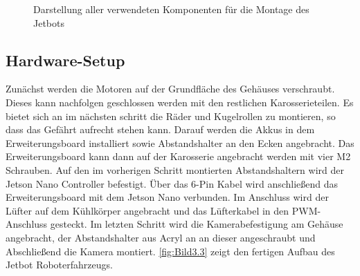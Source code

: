 \begin{figure}[H]
    \centering
    \caption[Komponenten Jetbot]{Darstellung aller verwendeten Komponenten für die Montage des Jetbots}
    \label{fig:Bild3.2}
\end{figure}

\subsection{Hardware-Setup}

Zunächst werden die Motoren auf der Grundfläche des Gehäuses verschraubt. Dieses kann nachfolgen geschlossen werden mit den restlichen Karosserieteilen. Es bietet sich an im nächsten schritt die Räder und Kugelrollen zu montieren, so dass das Gefährt aufrecht stehen kann. Darauf werden die Akkus in dem Erweiterungsboard installiert sowie Abstandshalter an den Ecken angebracht. Das Erweiterungsboard kann dann auf der Karosserie angebracht werden mit vier M2 Schrauben. Auf den im vorherigen Schritt montierten Abstandshaltern wird der Jetson Nano Controller befestigt. Über das 6-Pin Kabel wird anschließend das Erweiterungsboard mit dem Jetson Nano verbunden. Im Anschluss wird der Lüfter auf dem Kühlkörper angebracht und das Lüfterkabel in den PWM-Anschluss gesteckt. Im letzten Schritt wird die Kamerabefestigung am Gehäuse angebracht, der Abstandshalter aus Acryl an an dieser angeschraubt und Abschließend die Kamera montiert. \autoref{fig:Bild3.3} zeigt den fertigen Aufbau des Jetbot Roboterfahrzeugs.

